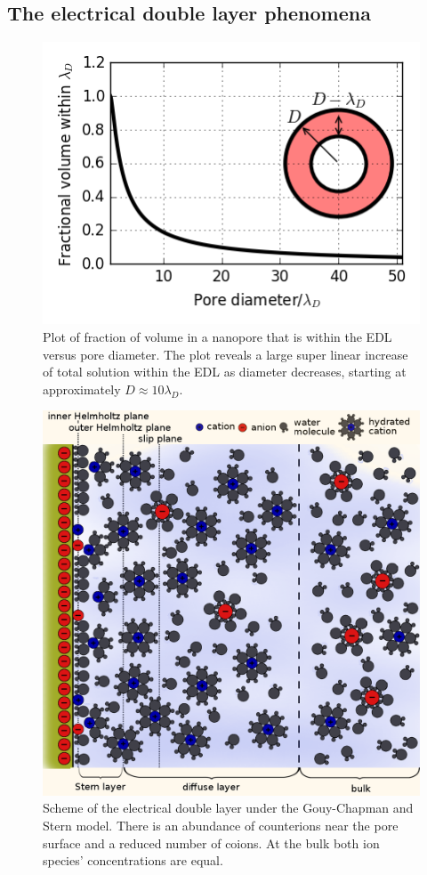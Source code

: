 			
		\subsection{The electrical double layer phenomena}
		
			\begin{figure}
				\includegraphics{fractioninsideedl.png}
				\caption{Plot of fraction of volume in a nanopore that is within the EDL versus pore diameter. The plot reveals a large super linear increase of total solution within the EDL as diameter decreases, starting at approximately $D\approx 10\lambda_{D}$.}
				
				\label{fig:fractioninsideedl}
			\end{figure}
			
			\begin{figure}
				\includegraphics[width=\textwidth]{edl.png}
				\caption{Scheme of the electrical double layer under the Gouy-Chapman and Stern model. There is an abundance of counterions near the pore surface and a reduced number of coions. At the bulk both ion species' concentrations are equal.}
				
				 \label{fig:edl}
			\end{figure}
			
